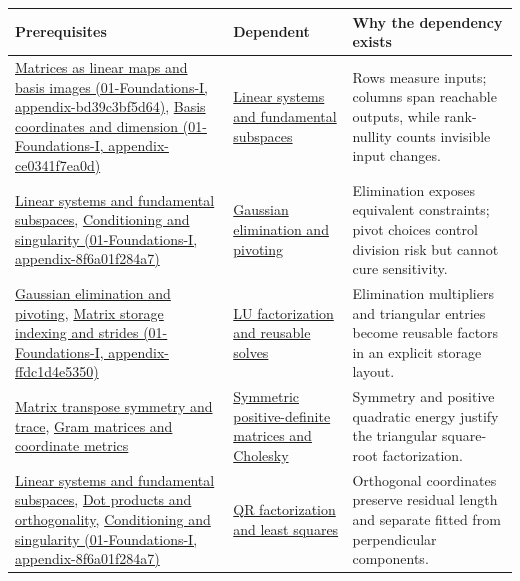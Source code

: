 {\def\LTcaptype{none} %
\begin{longtable}[]{@{}
  >{\raggedright\arraybackslash}p{}
  >{\raggedright\arraybackslash}p{}
  >{\raggedright\arraybackslash}p{}@{}}
\toprule\noalign{}
\begin{minipage}[b]{\linewidth}\raggedright
Prerequisites
\end{minipage} & \begin{minipage}[b]{\linewidth}\raggedright
Dependent
\end{minipage} & \begin{minipage}[b]{\linewidth}\raggedright
Why the dependency exists
\end{minipage} \\
\midrule\noalign{}
\endhead
\bottomrule\noalign{}
\endlastfoot
\href{}{Matrices as linear maps and basis images (01-Foundations-I, appendix-bd39c3bf5d64)}, \href{}{Basis coordinates and dimension (01-Foundations-I, appendix-ce0341f7ea0d)} & \hyperref[appendix-8572a4a060c1]{Linear systems and fundamental subspaces} & Rows measure inputs; columns span reachable outputs, while rank-nullity counts invisible input changes. \\
\hyperref[appendix-8572a4a060c1]{Linear systems and fundamental subspaces}, \href{}{Conditioning and singularity (01-Foundations-I, appendix-8f6a01f284a7)} & \hyperref[appendix-f6e77f4a200f]{Gaussian elimination and pivoting} & Elimination exposes equivalent constraints; pivot choices control division risk but cannot cure sensitivity. \\
\hyperref[appendix-f6e77f4a200f]{Gaussian elimination and pivoting}, \href{}{Matrix storage indexing and strides (01-Foundations-I, appendix-ffdc1d4e5350)} & \hyperref[appendix-55e4b5b0a1e6]{LU factorization and reusable solves} & Elimination multipliers and triangular entries become reusable factors in an explicit storage layout. \\
\hyperref[appendix-175ca5ff874d]{Matrix transpose symmetry and trace}, \hyperref[appendix-3b863809f82a]{Gram matrices and coordinate metrics} & \hyperref[appendix-50d2ea3c9b26]{Symmetric positive-definite matrices and Cholesky} & Symmetry and positive quadratic energy justify the triangular square-root factorization. \\
\hyperref[appendix-8572a4a060c1]{Linear systems and fundamental subspaces}, \hyperref[appendix-8bc4e8fc547c]{Dot products and orthogonality}, \href{}{Conditioning and singularity (01-Foundations-I, appendix-8f6a01f284a7)} & \hyperref[appendix-c3421e6b4f2c]{QR factorization and least squares} & Orthogonal coordinates preserve residual length and separate fitted from perpendicular components. \\

\end{longtable}}

